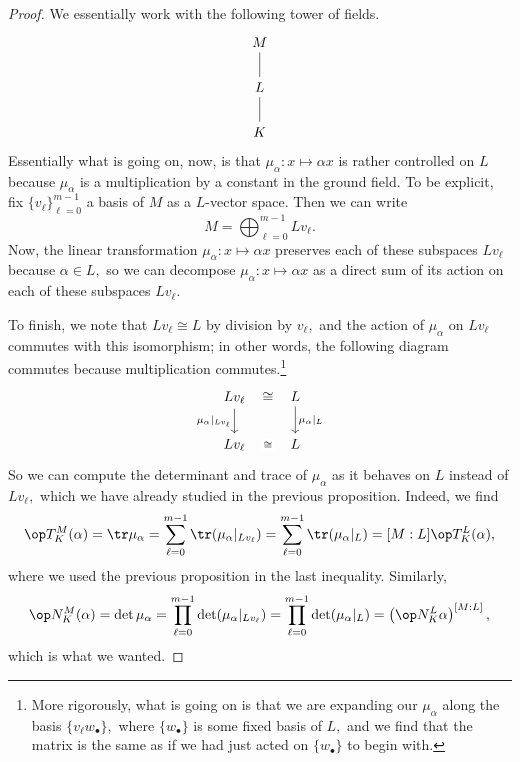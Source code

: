 \begin{proof}
	We essentially work with the following tower of fields.
	\[\begin{tikzcd}
		M \\
		L \\
		K
		\arrow[no head, from=3-1, to=2-1]
		\arrow[no head, from=2-1, to=1-1]
	\end{tikzcd}\]
	Essentially what is going on, now, is that $\mu_\alpha:x\mapsto \alpha x$ is rather controlled on $L$ because $\mu_\alpha$ is a multiplication by a constant in the ground field. To be explicit, fix $\{v_\ell\}_{\ell=0}^{m-1}$ a basis of $M$ as a $L$-vector space. Then we can write
	\[M=\bigoplus_{\ell=0}^{m-1}Lv_\ell.\]
	Now, the linear transformation $\mu_\alpha:x\mapsto \alpha x$ preserves each of these subspaces $Lv_\ell$ because $\alpha\in L,$ so we can decompose $\mu_\alpha:x\mapsto \alpha x$ as a direct sum of its action on each of these subspaces $Lv_\ell.$

	To finish, we note that $Lv_\ell\cong L$ by division by $v_\ell,$ and the action of $\mu_\alpha$ on $Lv_\ell$ commutes with this isomorphism; in other words, the following diagram commutes because multiplication commutes.\footnote{More rigorously, what is going on is that we are expanding our $\mu_\alpha$ along the basis $\{v_\ell w_\bullet\},$ where $\{w_\bullet\}$ is some fixed basis of $L,$ and we find that the matrix is the same as if we had just acted on $\{w_\bullet\}$ to begin with.}
	\[\begin{tikzcd}
		{Lv_\ell} & {L} \\
		{Lv_\ell} & {L}
		\arrow["{\mu_\alpha|_{Lv_\ell}}"', from=1-1, to=2-1]
		\arrow["\cong"{marking}, draw=none, from=1-1, to=1-2]
		\arrow["\cong"{description}, draw=none, from=2-1, to=2-2]
		\arrow["{\mu_\alpha|_L}", from=1-2, to=2-2]
	\end{tikzcd}\]
	So we can compute the determinant and trace of $\mu_\alpha$ as it behaves on $L$ instead of $Lv_\ell,$ which we have already studied in the previous proposition. Indeed, we find
	\[\op T^M_K(\alpha)=\tr\mu_\alpha=\sum_{\ell=0}^{m-1}\tr(\mu_\alpha|_{Lv_\ell})=\sum_{\ell=0}^{m-1}\tr(\mu_\alpha|_L)=[M:L]\op T^L_K(\alpha),\]
	where we used the previous proposition in the last inequality. Similarly,
	\[\op N^M_K(\alpha)=\det\mu_\alpha=\prod_{\ell=0}^{m-1}\det(\mu_\alpha|_{Lv_\ell})=\prod_{\ell=0}^{m-1}\det(\mu_\alpha|_L)=\left(\op N^L_K\alpha\right)^{[M:L]},\]
	which is what we wanted.
\end{proof}
